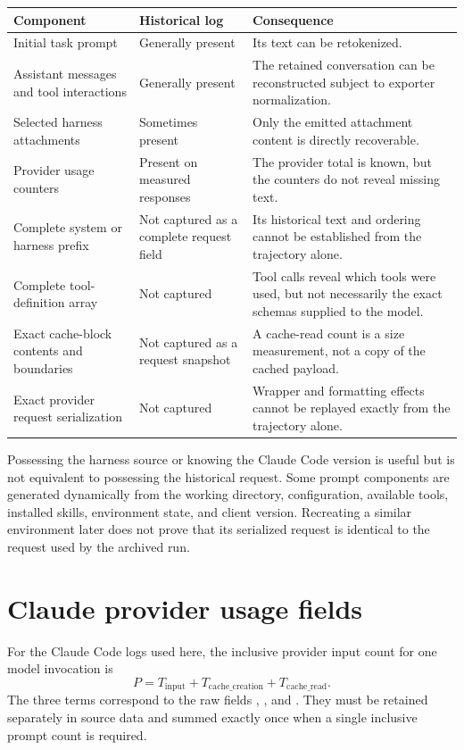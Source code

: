\documentclass[11pt]{article}
\begin{document}
\begin{center}
\small
\begin{tabularx}{\textwidth}{@{}p{}p{}X@{}}
\toprule
\textbf{Component} & \textbf{Historical log} & \textbf{Consequence} \\
\midrule
Initial task prompt & Generally present & Its text can be retokenized. \\
Assistant messages and tool interactions & Generally present & The retained
conversation can be reconstructed subject to exporter normalization. \\
Selected harness attachments & Sometimes present & Only the emitted attachment
content is directly recoverable. \\
Provider usage counters & Present on measured responses & The provider total is
known, but the counters do not reveal missing text. \\
Complete system or harness prefix & Not captured as a complete request field & Its
historical text and ordering cannot be established from the trajectory alone. \\
Complete tool-definition array & Not captured & Tool calls reveal which tools were
used, but not necessarily the exact schemas supplied to the model. \\
Exact cache-block contents and boundaries & Not captured as a request snapshot & A
cache-read count is a size measurement, not a copy of the cached payload. \\
Exact provider request serialization & Not captured & Wrapper and formatting
effects cannot be replayed exactly from the trajectory alone. \\
\bottomrule
\end{tabularx}
\end{center}

Possessing the harness source or knowing the Claude Code version is useful but is
not equivalent to possessing the historical request.  Some prompt components are
generated dynamically from the working directory, configuration, available
tools, installed skills, environment state, and client version.  Recreating a
similar environment later does not prove that its serialized request is identical
to the request used by the archived run.


\section*{Claude provider usage fields}

For the Claude Code logs used here, the inclusive provider input count for one
model invocation is
\[
  P = T_{\mathrm{input}}
      + T_{\mathrm{cache\_creation}}
      + T_{\mathrm{cache\_read}}.
\]
The three terms correspond to the raw fields
, , and
.  They must be retained separately in source data
and summed exactly once when a single inclusive prompt count is required.
\end{document}
